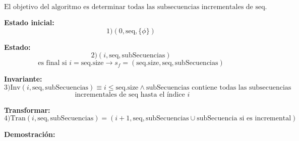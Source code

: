 \documentclass[12pt, a4paper]{article}
\begin{document}
\[ \text{El objetivo del algoritmo es determinar todas las subsecuencias incrementales de } \text{seq}. \]

\textbf{Estado inicial:}
\[ 1) (0, \text{seq}, \{\phi\}) \]

\textbf{Estado:}
\[ 2) (i, \text{seq}, \text{subSecuencias}) \]
\[ \text{es final si } i = \text{seq.size} \rightarrow s_f = (\text{seq.size}, \text{seq}, \text{subSecuencias}) \]

\textbf{Invariante:}
\[ 3) \text{Inv}(i, \text{seq}, \text{subSecuencias}) \equiv i \leq \text{seq.size} \land \text{subSecuencias} \text{ contiene todas las subsecuencias} \]
\[ \text{ incrementales de } \text{seq} \text{ hasta el índice } i \]

\textbf{Transformar:}
\[ 4) \text{Tran}(i, \text{seq}, \text{subSecuencias}) = (i+1, \text{seq}, \text{subSecuencias} \cup \text{subSecuencia} \text{ si es incremental}) \]

\textbf{Demostración:}
\end{document}
